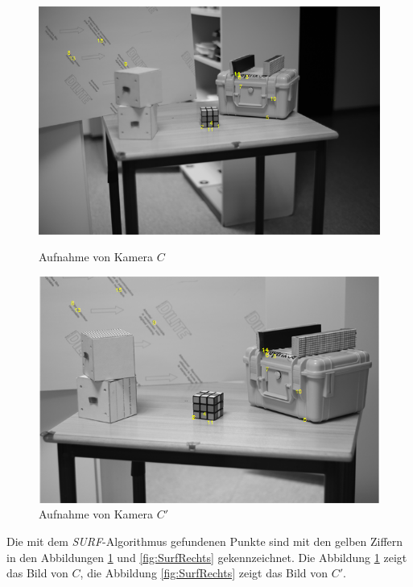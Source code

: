 \begin{figure}[!htb]
	\includegraphics[width=\linewidth]{images/PointsDetectedLeft.png}
	\caption[Aufnahme von Kamera $C$]{Aufnahme von Kamera $C$}
	\label{fig:SurfRechts}
	\endminipage\hfill
	\includegraphics[width=\linewidth]{images/PointsDetectedRight.png}
	\caption[Aufnahme von Kamera $C'$]{Aufnahme von Kamera $C'$}
	\label{fig:SurfLinks}
	\endminipage\hfill
\end{figure}

Die mit dem \textit{SURF}-Algorithmus gefundenen Punkte sind mit den gelben Ziffern in den Abbildungen \ref{fig:SurfLinks} und \ref{fig:SurfRechts} gekennzeichnet. Die Abbildung \ref{fig:SurfLinks} zeigt das Bild von $C$, die Abbildung \ref{fig:SurfRechts} zeigt das Bild von $C'$.\\

